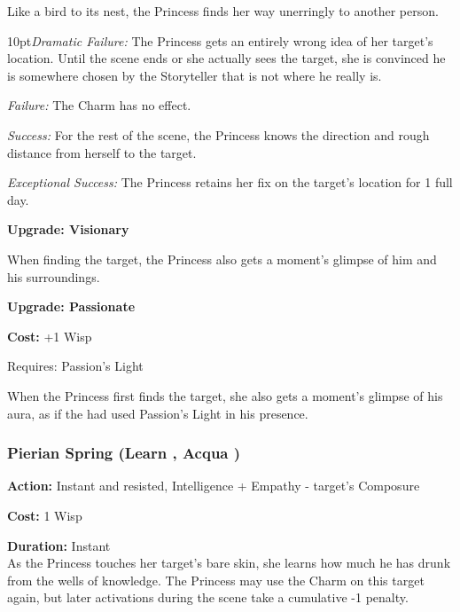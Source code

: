 Like a bird to its nest, the Princess finds her way unerringly to another person.

\begin{myindentpar}{10pt}\emph{Dramatic Failure:} The Princess gets an entirely wrong idea of her target's location. Until the scene ends or she actually sees the target, she is convinced he is somewhere chosen by the Storyteller that is not where he really is.

    \emph{Failure:} The Charm has no effect.

    \emph{Success:} For the rest of the scene, the Princess knows the direction and rough distance from herself to the target.

    \emph{Exceptional Success:} The Princess retains her fix on the target's location for 1 full day.

\textbf{Upgrade: Visionary}

When finding the target, the Princess also gets a moment's glimpse of him and his surroundings.

\textbf{Upgrade: Passionate}

\noindent \textbf{Cost:} +1 Wisp

Requires: Passion's Light

When the Princess first finds the target, she also gets a moment's glimpse of his aura, as if the had used Passion's Light in his presence. \end{myindentpar}

\subsubsection*{Pierian Spring (Learn \textbullet\textbullet, Acqua \textbullet)}

\noindent \textbf{Action:} Instant and resisted, Intelligence + Empathy - target's Composure

\noindent \textbf{Cost:} 1 Wisp

\noindent \textbf{Duration:} Instant \\

\noindent As the Princess touches her target's bare skin, she learns how much he has drunk from the wells of knowledge. The Princess may use the Charm on this target again, but later activations during the scene take a cumulative -1 penalty.


